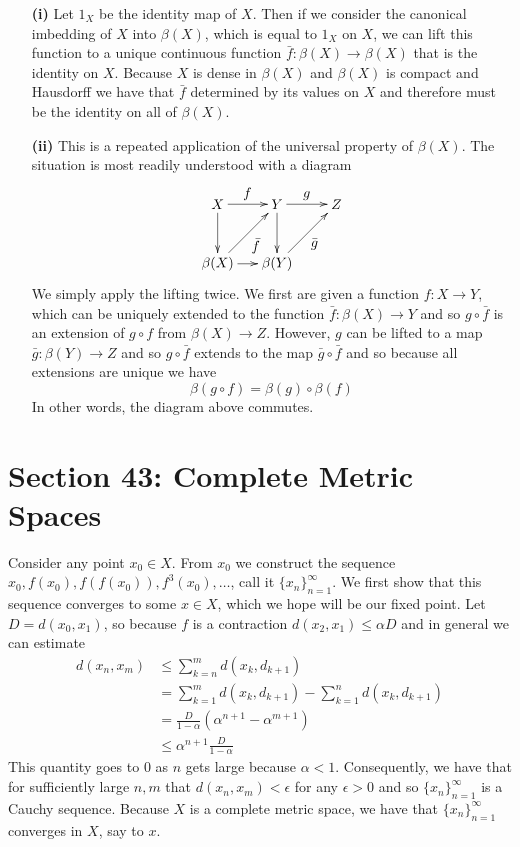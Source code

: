 \documentclass{article}
\newcommand{\exercise}[1]{\noindent{\textbf{Exercise #1:}}}
\newcommand{\seq}[2]{\{#1_{#2}\}_{#2 = 1}^\infty}
\begin{document}
\exercise{38.10}
\begin{enumerate}
\item[\textbf{(i)}] Let $1_X$ be the identity map of $X$. Then if we
  consider the canonical imbedding of $X$ into $\beta(X)$, which is
  equal to $1_X$ on $X$, we can lift this function to a unique continuous
  function $\bar{f}: \beta(X) \to \beta(X)$ that is the identity on
  $X$. Because $X$ is dense in $\beta(X)$ and $\beta(X)$ is compact
  and Hausdorff we have that $\bar{f}$ determined by its values on $X$
  and therefore must be the identity on all of $\beta(X)$.
\item[\textbf{(ii)}] This is a repeated application of the universal
  property of $\beta(X)$. The situation is most readily understood
  with a diagram
  \[
  \begin{xy}
    (0,0)*+{\beta(Y)}="BETAY"; (0,15)*+{Y}="Y";
    (-15,0)*+{\beta(X)}="BETAX"; (-15,15)*+{X}="X";
    (15,15)*+{Z}="Z";
    {\ar "X";"BETAX"};
    {\ar "Y";"BETAY"};
    {\ar^{\mathlarger{f}} "X";"Y"};
    {\ar^{\mathlarger{g}} "Y";"Z"};
    {\ar_{\mathlarger{\bar{f}}} "BETAX";"Y"};
    {\ar_{\mathlarger{\bar{g}}} "BETAY";"Z"};
    {\ar "BETAX";"BETAY"};
  \end{xy}
  \]
  We simply apply the lifting twice. We first are given a function $f:
  X \to Y$, which can be uniquely extended to the function $\bar{f}:
  \beta(X) \to Y$ and so $g \circ \bar{f}$ is an extension of $g\circ
  f$ from $\beta(X) \to Z$. However, $g$ can be lifted to a map
  $\bar{g}: \beta(Y) \to Z$ and so $g\circ \bar{f}$ extends to the map
  $\bar{g} \circ \bar{f}$ and so because all extensions are unique we have
  \[
  \beta(g \circ f) = \beta(g) \circ \beta(f)
  \]
  In other words, the diagram above commutes.
\end{enumerate}

\section{Section 43: Complete Metric Spaces}

Consider any point $x_0 \in X$. From $x_0$ we construct the sequence
$x_0, f(x_0), f(f(x_0)), f^3(x_0),\ldots$, call it $\seq{x}{n}$. We
first show that this sequence converges to some $x \in X$, which we
hope will be our fixed point. Let $D = d(x_0, x_1)$, so because $f$ is
a contraction $d(x_2,x_1) \leq \alpha D$ and in general we can estimate
\begin{align*}
  d(x_n,x_m) &\leq \sum_{k=n}^m d(x_k, d_{k+1}) \\
  &= \sum_{k=1}^m d(x_k, d_{k+1}) - \sum_{k=1}^n d(x_k, d_{k+1}) \\
  &= \frac{D}{1-\alpha} (\alpha^{n+1} - \alpha^{m+1}) \\
  &\leq \alpha^{n+1}\frac{D}{1-\alpha}
\end{align*}
This quantity goes to $0$ as $n$ gets large because $\alpha <
1$. Consequently, we have that for sufficiently large $n,m$ that
$d(x_n, x_m) < \epsilon$ for any $\epsilon > 0$ and so $\seq{x}{n}$ is
a Cauchy sequence. Because $X$ is a complete metric space, we have
that $\seq{x}{n}$ converges in $X$, say to $x$.
\end{document}
